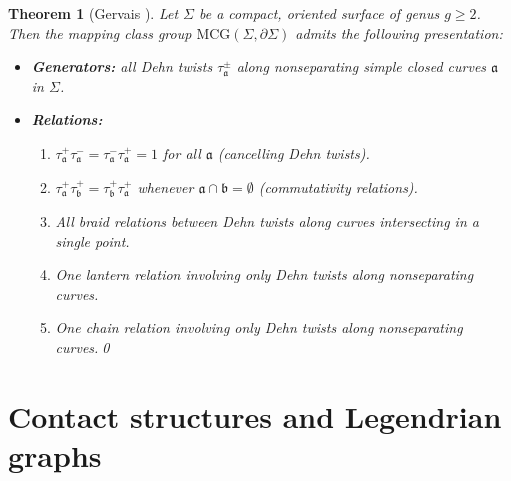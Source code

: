 \documentclass{amsart}
\numberwithin{equation}{section}
\numberwithin{figure}{section}
\newtheorem{theorem}{Theorem}[section]
\theoremstyle{definition}
\theoremstyle{remark}
\let\oldSigma\Sigma
\renewcommand{\Sigma}{\oldSigma}
\let\oldtau\tau
\renewcommand{\tau}{\oldtau}
\newcommand{\MCG}{\mathrm{MCG}}
\renewcommand{\aa}{\mathfrak{a}}
\newcommand{\bb}{\mathfrak{b}}
\begin{document}
\begin{theorem}[Gervais {\cite[Theorem~B]{Gervais}}]\label{thm:Gervais}
Let $\Sigma$ be a compact, oriented surface of genus $g\geq 2$. Then the mapping class group $\MCG(\Sigma,\partial\Sigma)$ admits the following presentation:
\begin{itemize}
    \item \textbf{Generators:} all Dehn twists $\tau_\aa^\pm$ along nonseparating simple closed curves $\aa$ in $\Sigma$.
    \item \textbf{Relations:}
    \begin{enumerate}[label=(\alph*)]
        \item $\tau_\aa^+ \tau_\aa^- = \tau_\aa^- \tau_\aa^+ = 1$ for all $\aa$ \textup{(cancelling Dehn twists)}.
        \item $\tau_\aa^+ \tau_\bb^+ = \tau_\bb^+ \tau_\aa^+$ whenever $\aa\cap \bb=\emptyset$ \textup{(commutativity relations)}.
        \item All braid relations between Dehn twists along curves intersecting in a single point.
        \item One lantern relation involving only Dehn twists along nonseparating curves.
        \item One chain relation involving only Dehn twists along nonseparating curves.\qed
    \end{enumerate}
\end{itemize}
\end{theorem}

\section{Contact structures and Legendrian graphs}\label{sec:Legendrian_graphs}
\end{document}
